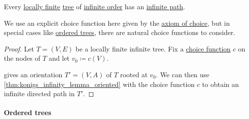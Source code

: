 \begin{lemma}\label{thm:konigs_infinity_lemma}
  Every \hyperref[def:graph_cardinality/local]{locally finite} \hyperref[def:tree]{tree} of \hyperref[def:graph_cardinality/order]{infinite order} has an \hyperref[def:graph_walk/path]{infinite path}.
\end{lemma}
\begin{comments}
  \item We use an explicit choice function here given by the \hyperref[def:zfc/choice]{axiom of choice}, but in special cases like \hyperref[def:ordered_tree]{ordered trees}, there are natural choice functions to consider.
\end{comments}
\begin{proof}
  Let \( T = (V, E) \) be a locally finite infinite tree. Fix a \hyperref[def:choice_function]{choice function} \( c \) on the nodes of \( T \) and let \( v_0 \coloneqq c(V) \).

   gives an orientation \( T' = (V, A) \) of \( T \) rooted at \( v_0 \). We can then use \cref{thm:konigs_infinity_lemma_oriented} with the choice function \( c \) to obtain an infinite directed path in \( T' \).
\end{proof}

\paragraph{Ordered trees}


